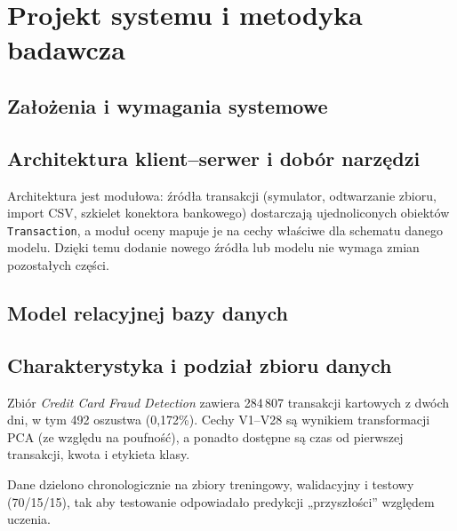 \chapter{Projekt systemu i metodyka badawcza}
\label{ch:projekt}

\section{Założenia i wymagania systemowe}

\section{Architektura klient--serwer i dobór narzędzi}
Architektura jest modułowa: źródła transakcji (symulator, odtwarzanie zbioru, import CSV, szkielet konektora bankowego) dostarczają ujednoliconych obiektów \texttt{Transaction}, a moduł oceny mapuje je na cechy właściwe dla schematu danego modelu. Dzięki temu dodanie nowego źródła lub modelu nie wymaga zmian pozostałych części. 

\section{Model relacyjnej bazy danych}

\section{Charakterystyka i podział zbioru danych}
Zbiór \emph{Credit Card Fraud Detection} \cite{kaggle_ulb} zawiera 284\,807 transakcji kartowych z dwóch dni, w tym 492 oszustwa (0{,}172\%). Cechy V1--V28 są wynikiem transformacji PCA (ze względu na poufność), a ponadto dostępne są czas od pierwszej transakcji, kwota i etykieta klasy. 

Dane dzielono chronologicznie na zbiory treningowy, walidacyjny i testowy (70/15/15), tak aby testowanie odpowiadało predykcji „przyszłości” względem uczenia. 
